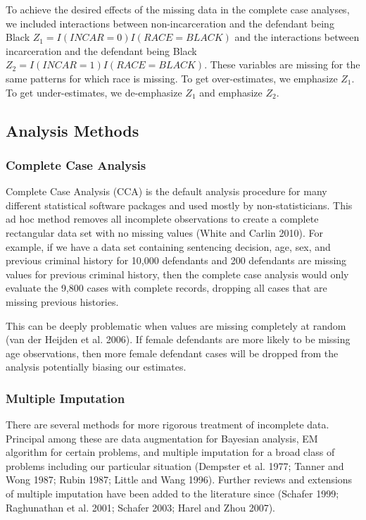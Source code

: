 \documentclass[
  letterpaper,
  DIV=11,
  numbers=noendperiod]{scrartcl}
\begin{document}
To achieve the desired effects of the missing data in the complete case
analyses, we included interactions between non-incarceration and the
defendant being Black \(Z_1 = I(INCAR = 0)I(RACE = BLACK)\) and the
interactions between incarceration and the defendant being Black
\(Z_{2} = I(INCAR = 1)I(RACE = BLACK)\). These variables are missing for
the same patterns for which race is missing. To get over-estimates, we
emphasize \(Z_1\). To get under-estimates, we de-emphasize \(Z_1\) and
emphasize \(Z_2\).

\hypertarget{sec-analysis}{%
\subsection{Analysis Methods}\label{sec-analysis}}

\hypertarget{sec-cca}{%
\subsubsection{Complete Case Analysis}\label{sec-cca}}

Complete Case Analysis (CCA) is the default analysis procedure for many
different statistical software packages and used mostly by
non-statisticians. This ad hoc method removes all incomplete
observations to create a complete rectangular data set with no missing
values (White and Carlin 2010). For example, if we have a data set
containing sentencing decision, age, sex, and previous criminal history
for 10,000 defendants and 200 defendants are missing values for previous
criminal history, then the complete case analysis would only evaluate
the 9,800 cases with complete records, dropping all cases that are
missing previous histories.

This can be deeply problematic when values are missing completely at
random (van der Heijden et al. 2006). If female defendants are more
likely to be missing age observations, then more female defendant cases
will be dropped from the analysis potentially biasing our estimates.

\hypertarget{sec-mi}{%
\subsubsection{Multiple Imputation}\label{sec-mi}}

There are several methods for more rigorous treatment of incomplete
data. Principal among these are data augmentation for Bayesian analysis,
EM algorithm for certain problems, and multiple imputation for a broad
class of problems including our particular situation (Dempster et al.
1977; Tanner and Wong 1987; Rubin 1987; Little and Wang 1996). Further
reviews and extensions of multiple imputation have been added to the
literature since (Schafer 1999; Raghunathan et al. 2001; Schafer 2003;
Harel and Zhou 2007).
\end{document}
